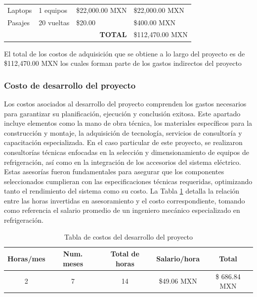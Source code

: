 \begin{table}[H]
\begin{tabular}{@{}llll@{}}
  		Laptops                                                                                                  & 1 equipos                    & \$22,000.00 MXN                        & \$22,000.00 MXN                 \\
  		Pasajes                                                                                                  & 20 vueltas                   & \$20.00                                & \$400.00 MXN                    \\
  		&                              & \multicolumn{1}{r}{\textbf{TOTAL}}             & \$112,470.00 MXN                \\ \bottomrule
  	\end{tabular}
  \end{table}
  
  El total de los costos de adquisición que se obtiene a lo largo del proyecto es de  \$112,470.00 MXN  los cuales forman parte de los gastos indirectos del proyecto
  
  \subsubsection{Costo de desarrollo del proyecto}
  
  Los costos asociados al desarrollo del proyecto comprenden los gastos necesarios para garantizar su planificación, ejecución y conclusión exitosa. Este apartado incluye elementos como la mano de obra técnica, los materiales específicos para la construcción y montaje, la adquisición de tecnología, servicios de consultoría y capacitación especializada. En el caso particular de este proyecto, se realizaron consultorías técnicas enfocadas en la selección y dimensionamiento de equipos de refrigeración, así como en la integración de los accesorios del sistema eléctrico. Estas asesorías fueron fundamentales para asegurar que los componentes seleccionados cumplieran con las especificaciones técnicas requeridas, optimizando tanto el rendimiento del sistema como su costo. La Tabla \ref{tabla:costos-desarrollo} detalla la relación entre las horas invertidas en asesoramiento y el costo correspondiente, tomando como referencia el salario promedio de un ingeniero mecánico especializado en refrigeración.
  
  
  
  
  \begin{table}[]
  	\centering
  	\caption{Tabla de costos del desarrollo del proyecto}
  	\label{tabla:costos-desarrollo}
  	\begin{tabular}{@{}ccccc@{}}
  		\toprule
  		Horas/mes & Num. meses & Total de horas & Salario/hora & Total         \\ \midrule
  		2         & 7          & 14             & \$49.06 MXN  & \$ 686.84 MXN \\ \bottomrule
  	\end{tabular}
  \end{table}
  
